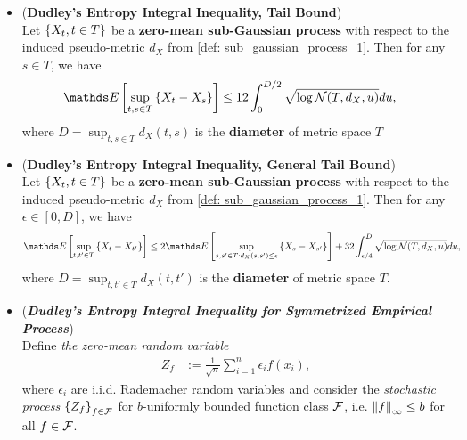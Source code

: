 \documentclass[11pt]{article}
\begin{document}
\begin{itemize}
\item \begin{theorem} (\textbf{Dudley's Entropy Integral Inequality, Tail Bound}) \citep{boucheron2013concentration}\\
Let $\left\{X_{t}, t \in T\right\}$ be a \textbf{zero-mean sub-Gaussian process}  with respect to the induced pseudo-metric $d_X$ from \eqref{def: sub_gaussian_process_1}. Then for any $s \in T$,  we have
\begin{align}
\E{}{\sup_{t, s \in T}\set{X_t - X_{s}}} &\le  12 \int_{0}^{D/2}\sqrt{\log \cN(T, d_{X}, u)} du, \label{ineqn: dudley_metric_entropy_integral_inequality_tail_difference}
\end{align} where $D  = \sup_{t, s\in T}d_{X}(t, s)$ is the \textbf{diameter} of metric space $T$
\end{theorem}

\item \begin{theorem} (\textbf{Dudley's Entropy Integral Inequality, General Tail Bound}) \citep{wainwright2019high}\\
Let $\left\{X_{t}, t \in T\right\}$ be a \textbf{zero-mean sub-Gaussian process}  with respect to the induced pseudo-metric $d_X$ from \eqref{def: sub_gaussian_process_1}. Then for any $\epsilon \in [0, D]$,  we have
\begin{align}
\E{}{\sup_{t, t' \in T}\set{X_t - X_{t'}}} &\le 2\E{}{\sup_{s, s' \in T: d_X(s, s') \le \epsilon}\set{X_s - X_{s'}}} + 32 \int_{\epsilon/4}^{D}\sqrt{\log \cN(T, d_{X}, u)} du, \label{ineqn: dudley_metric_entropy_integral_inequality_tail_difference_general}
\end{align} where $D  = \sup_{t, t'\in T}d_{X}(t, t')$ is the \textbf{diameter} of metric space $T$.
\end{theorem}

\item \begin{remark} (\textbf{\emph{Dudley's Entropy Integral Inequality for Symmetrized Empirical Process}}) \\
Define \emph{the zero-mean random variable} 
\begin{align*}
Z_f &:= \frac{1}{\sqrt{n}}\sum_{i=1}^n \epsilon_i f(x_i),
\end{align*} where $\epsilon_i$ are i.i.d. Rademacher random variables and consider the \emph{stochastic process} $\left\{Z_f\right\}_{ f \in {\mathcal F}}$ for $b$-uniformly bounded function class ${\mathcal F}$, i.e. $\left\|f\right\|_{\infty} \le b$ for all $f \in {\mathcal F}$.


\end{remark}
\end{itemize}
\end{document}
